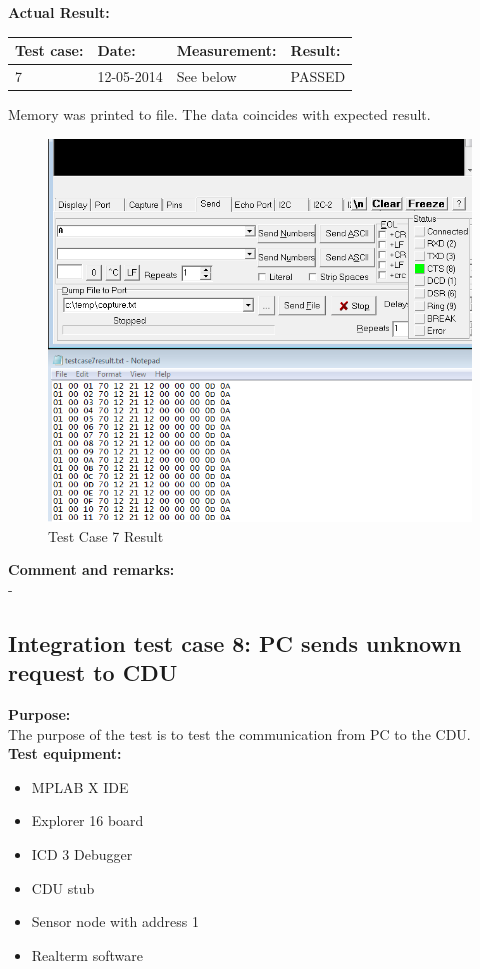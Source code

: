 \textbf{Actual Result:}\\
\begin{table}[H]
\centering
\begin{tabular}{|p{2cm}|p{2cm}|p{3cm}|p{2cm}|}\hline
\textbf{Test case:} & \textbf{Date:} & \textbf{Measurement:} & \textbf{Result:} \\ \hline
7 & 12-05-2014 & See below & PASSED \\ \hline
\end{tabular}
\end{table}
Memory was printed to file. The data coincides with expected result.
\begin{figure}[H]
\centering
\includegraphics[width=1\textwidth]{billeder/inte07}
\caption{Test Case 7 Result}
\label{fig:InteTestCase7}
\end{figure}

\textbf{Comment and remarks:}\\
-\\

\subsection{Integration test case 8: PC sends unknown request to CDU}
\textbf{Purpose:}\\
The purpose of the test is to test the communication from PC to the CDU.\\

\textbf{Test equipment:}
\begin{itemize}
\item MPLAB X IDE
\item Explorer 16 board
\item ICD 3 Debugger
\item CDU stub
\item Sensor node with address 1
\item Realterm software
\end{itemize}

